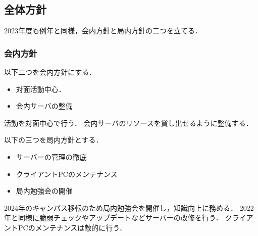 \subsection*{全体方針}


2023年度も例年と同様，会内方針と局内方針の二つを立てる．

\subsubsection*{会内方針}
以下二つを会内方針にする．
\begin{itemize}
    \item 対面活動中心．
    \item 会内サーバの整備
\end{itemize}
活動を対面中心で行う．
会内サーバのリソースを貸し出せるように整備する．

以下の三つを局内方針とする．
\begin{itemize}
    \item サーバーの管理の徹底
    \item クライアントPCのメンテナンス
    \item 局内勉強会の開催
\end{itemize}
2024年のキャンパス移転のため局内勉強会を開催し，知識向上に務める．
2022年と同様に脆弱チェックやアップデートなどサーバーの改修を行う．
クライアントPCのメンテナンスは敵的に行う．
    